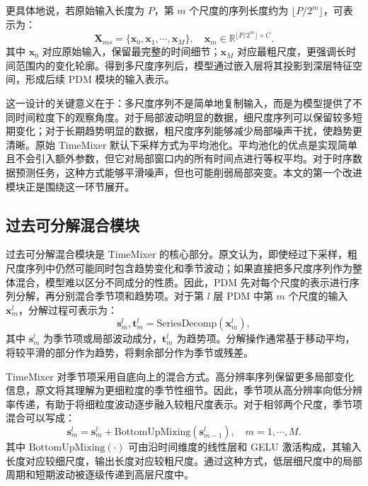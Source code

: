 更具体地说，若原始输入长度为 $P$，第 $m$ 个尺度的序列长度约为 $\lfloor P/2^m\rfloor$，可表示为：
\begin{equation}
    \mathbf{X}_{ms}=\{\mathbf{x}_0,\mathbf{x}_1,\cdots,\mathbf{x}_M\},\quad
    \mathbf{x}_m\in \mathbb{R}^{\lfloor P/2^m\rfloor\times C}.
\end{equation}
其中 $\mathbf{x}_0$ 对应原始输入，保留最完整的时间细节；$\mathbf{x}_M$ 对应最粗尺度，更强调长时间范围内的变化轮廓。得到多尺度序列后，模型通过嵌入层将其投影到深层特征空间，形成后续 PDM 模块的输入表示。

这一设计的关键意义在于：多尺度序列不是简单地复制输入，而是为模型提供了不同时间粒度下的观察角度。对于局部波动明显的数据，细尺度序列可以保留较多短期变化；对于长期趋势明显的数据，粗尺度序列能够减少局部噪声干扰，使趋势更清晰。原始 TimeMixer 默认下采样方式为平均池化。平均池化的优点是实现简单且不会引入额外参数，但它对局部窗口内的所有时间点进行等权平均。对于时序数据预测任务，这种方式能够平滑噪声，但也可能削弱局部突变。本文的第一个改进模块正是围绕这一环节展开。

\subsection{过去可分解混合模块}

过去可分解混合模块是 TimeMixer 的核心部分。原文认为，即使经过下采样，粗尺度序列中仍然可能同时包含趋势变化和季节波动；如果直接把多尺度序列作为整体混合，模型难以区分不同成分的性质。因此，PDM 先对每个尺度的表示进行序列分解，再分别混合季节项和趋势项。对于第 $l$ 层 PDM 中第 $m$ 个尺度的输入 $\mathbf{x}_m^{l}$，分解过程可表示为：
\begin{equation}
    \mathbf{s}_m^{l},\mathbf{t}_m^{l}=\mathrm{SeriesDecomp}(\mathbf{x}_m^{l}),
\end{equation}
其中 $\mathbf{s}_m^{l}$ 为季节项或局部波动成分，$\mathbf{t}_m^{l}$ 为趋势项。分解操作通常基于移动平均，将较平滑的部分作为趋势，将剩余部分作为季节或残差。

TimeMixer 对季节项采用自底向上的混合方式。高分辨率序列保留更多局部变化信息，原文将其理解为更细粒度的季节性细节。因此，季节项从高分辨率向低分辨率传递，有助于将细粒度波动逐步融入较粗尺度表示。对于相邻两个尺度，季节项混合可以写成：
\begin{equation}
    \mathbf{s}_m^{l}=\mathbf{s}_m^{l}+\mathrm{BottomUpMixing}(\mathbf{s}_{m-1}^{l}),\quad m=1,\cdots,M.
\end{equation}
其中 $\mathrm{BottomUpMixing}(\cdot)$ 可由沿时间维度的线性层和 GELU 激活构成，其输入长度对应较细尺度，输出长度对应较粗尺度。通过这种方式，低层细尺度中的局部周期和短期波动被逐级传递到高层尺度中。

